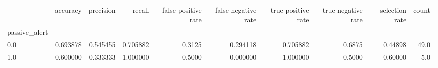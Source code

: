\begin{tabular}{lrrrrrrrrr}
\toprule
{} &  accuracy &  precision &    recall &  false positive rate &  false negative rate &  true positive rate &  true negative rate &  selection rate &  count \\
passive\_alert &           &            &           &                      &                      &                     &                     &                 &        \\
\midrule
0.0           &  0.693878 &   0.545455 &  0.705882 &               0.3125 &             0.294118 &            0.705882 &              0.6875 &         0.44898 &   49.0 \\
1.0           &  0.600000 &   0.333333 &  1.000000 &               0.5000 &             0.000000 &            1.000000 &              0.5000 &         0.60000 &    5.0 \\
\bottomrule
\end{tabular}
